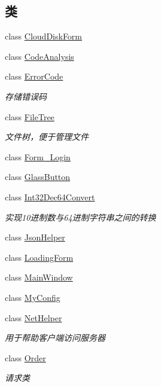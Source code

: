 \subsection*{类}
\begin{DoxyCompactItemize}
\item 
class \hyperlink{classcustom__cloud_1_1_cloud_disk_form}{Cloud\+Disk\+Form}
\item 
class \hyperlink{classcustom__cloud_1_1_code_analysis}{Code\+Analysis}
\item 
class \hyperlink{classcustom__cloud_1_1_error_code}{Error\+Code}
\begin{DoxyCompactList}\small\item\em 存储错误码 \end{DoxyCompactList}\item 
class \hyperlink{classcustom__cloud_1_1_file_tree}{File\+Tree}
\begin{DoxyCompactList}\small\item\em 文件树，便于管理文件 \end{DoxyCompactList}\item 
class \hyperlink{classcustom__cloud_1_1_form___login}{Form\+\_\+\+Login}
\item 
class \hyperlink{classcustom__cloud_1_1_glass_button}{Glass\+Button}
\item 
class \hyperlink{classcustom__cloud_1_1_int32_dec64_convert}{Int32\+Dec64\+Convert}
\begin{DoxyCompactList}\small\item\em 实现10进制数与64进制字符串之间的转换 \end{DoxyCompactList}\item 
class \hyperlink{classcustom__cloud_1_1_json_helper}{Json\+Helper}
\item 
class \hyperlink{classcustom__cloud_1_1_loading_form}{Loading\+Form}
\item 
class \hyperlink{classcustom__cloud_1_1_main_window}{Main\+Window}
\item 
class \hyperlink{classcustom__cloud_1_1_my_config}{My\+Config}
\item 
class \hyperlink{classcustom__cloud_1_1_net_helper}{Net\+Helper}
\begin{DoxyCompactList}\small\item\em 用于帮助客户端访问服务器 \end{DoxyCompactList}\item 
class \hyperlink{classcustom__cloud_1_1_order}{Order}
\begin{DoxyCompactList}\small\item\em 请求类 \end{DoxyCompactList}\item 

\end{DoxyCompactItemize}
